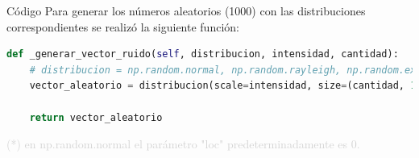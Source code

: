 \documentclass{beamer}
\begin{document}
\begin{frame}[fragile]{Código}
	\justifying
	Para generar los números aleatorios (1000) con las distribuciones correspondientes se realizó la siguiente función:
	
	\begin{lstlisting}[language=Python]
def _generar_vector_ruido(self, distribucion, intensidad, cantidad):
	# distribucion = np.random.normal, np.random.rayleigh, np.random.exponential
	vector_aleatorio = distribucion(scale=intensidad, size=(cantidad, 1))
	
	return vector_aleatorio
	\end{lstlisting}
	
	\vfill
	\footnotesize \textcolor{lightgray}{(*) en np.random.normal el parámetro "loc" predeterminadamente es 0.}
\end{frame}
\end{document}
